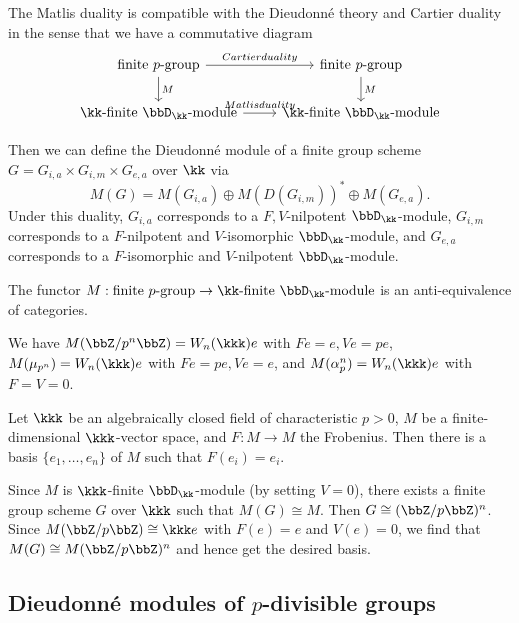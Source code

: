 \begin{theorem}
	The Matlis duality is compatible with the Dieudonn\'e theory and Cartier duality in the sense that we have a commutative diagram
	\[ \begin{tikzcd}
			\text{finite $p$-group} \arrow[r, "Cartier duality"] \arrow[d, "M"] & \text{finite $p$-group} \arrow[d, "M"] \\
			\text{$\kk$-finite $\bbD_\kk$-module} \arrow[r, "Matlis duality"] & \text{$\kk$-finite $\bbD_\kk$-module}
		\end{tikzcd} \]
\end{theorem}

Then we can define the Dieudonn\'e module of a finite group scheme $G = G_{i,a} \times G_{i,m} \times G_{e,a}$ over $\kk$ via
\[ M(G) = M(G_{i,a}) \oplus M(D(G_{i,m}))^* \oplus M(G_{e,a}). \]
Under this duality, $G_{i,a}$ corresponds to a $F,V$-nilpotent $\bbD_\kk$-module, $G_{i,m}$ corresponds to a $F$-nilpotent and $V$-isomorphic $\bbD_\kk$-module, and $G_{e,a}$ corresponds to a $F$-isomorphic and $V$-nilpotent $\bbD_\kk$-module.

\begin{theorem}
	The functor $M: \text{finite $p$-group} \to \text{$\kk$-finite $\bbD_\kk$-module}$ is an anti-equivalence of categories.
\end{theorem}

\begin{example}
	We have $M(\bbZ/p^n \bbZ) = W_n(\kkk) e$ with $Fe = e, Ve = pe$, $M(\mu_{p^n}) = W_n(\kkk) e$ with $Fe = pe, Ve = e$, and $M(\alpha_{p}^n) = W_n(\kkk) e$ with $F = V = 0$.
\end{example}

\begin{example}
	Let $\kkk$ be an algebraically closed field of characteristic $p>0$, $M$ be a finite-dimensional $\kkk$-vector space, and $F: M \to M$ the Frobenius.
	Then there is a basis $\{e_1, \ldots, e_n\}$ of $M$ such that $F(e_i) = e_{i}$.

	Since $M$ is $\kkk$-finite $\bbD_\kk$-module (by setting $V = 0$), there exists a finite group scheme $G$ over $\kkk$ such that $M(G) \cong M$.
	Then $G \cong (\bbZ/p\bbZ)^n$.
	Since $M(\bbZ/p\bbZ) \cong \kkk e$ with $F(e) = e$ and $V(e) = 0$, we find that $M(G) \cong M(\bbZ/p\bbZ)^n$ and hence get the desired basis.
\end{example}


\subsection[Dieudonn\'e modules of p-divisible groups]{Dieudonn\'e modules of $p$-divisible groups}

